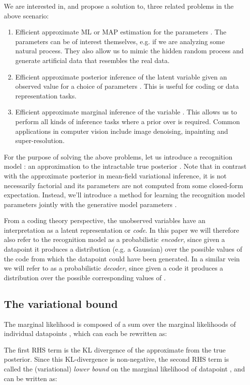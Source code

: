 \documentclass{article} \usepackage{nips13submit_e,times}
\theoremstyle{definition}
\theoremstyle{definition}
\begin{document}
We are interested in, and propose a solution to, three related problems in the above scenario:
\begin{enumerate}
\item Efficient approximate ML or MAP estimation for the parameters . The parameters can be of interest themselves, e.g. if we are analyzing some natural process. They also allow us to mimic the hidden random process and generate artificial data that resembles the real data.
\item Efficient approximate posterior inference of the latent variable  given an observed value  for a choice of parameters . This is useful for coding or data representation tasks.
\item Efficient approximate marginal inference of the variable . This allows us to perform all kinds of inference tasks where a prior over  is required. Common applications in computer vision include image denoising, inpainting and super-resolution.
\end{enumerate}

For the purpose of solving the above problems, let us introduce a recognition model : an approximation to the intractable true posterior . Note that in contrast with the approximate posterior in mean-field variational inference, it is not necessarily factorial and its parameters  are not computed from some closed-form expectation. Instead, we'll introduce a method for learning the recognition model parameters  jointly with the generative model parameters .



From a coding theory perspective, the unobserved variables  have an interpretation as a latent representation or \emph{code}.  In this paper we will therefore also refer to the recognition model  as a probabilistic \emph{encoder}, since given a datapoint  it produces a distribution (e.g. a Gaussian) over the possible values of the code  from which the datapoint  could have been generated. In a similar vein we will refer to  as a probabilistic \emph{decoder}, since given a code  it produces a distribution over the possible corresponding values of . 


\subsection{The variational bound}
The marginal likelihood is composed of a sum over the marginal likelihoods of individual datapoints , which can each be rewritten as:

The first RHS term is the KL divergence of the approximate from the true posterior. Since this KL-divergence is non-negative, the second RHS term  is called the (variational) \emph{lower bound} on the marginal likelihood of datapoint , and can be written as:
\end{document}
